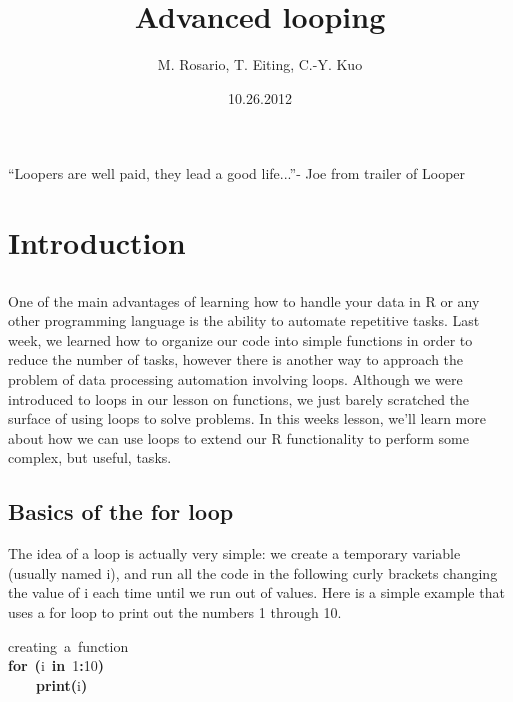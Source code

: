 \documentclass{article}\usepackage{graphicx, color}
\makeatletter
\newcommand{\hlnumber}[1]{\textcolor[rgb]{0,0,0}{#1}}%
\newcommand{\hlfunctioncall}[1]{\textcolor[rgb]{0.501960784313725,0,0.329411764705882}{\textbf{#1}}}%
\newcommand{\hlkeyword}[1]{\textcolor[rgb]{0,0,0}{\textbf{#1}}}%
\newcommand{\hlcomment}[1]{\textcolor[rgb]{0.180392156862745,0.6,0.341176470588235}{#1}}%
\newcommand{\hlsymbol}[1]{\textcolor[rgb]{0,0,0}{#1}}%
\newcommand{\hlstd}[1]{\textcolor[rgb]{0,0,0}{#1}}%
\newenvironment{kframe}{%
 \def\FrameCommand##1{\hskip\@totalleftmargin \hskip-\fboxsep
 \colorbox{shadecolor}{##1}\hskip-\fboxsep
     \hskip-\linewidth \hskip-\@totalleftmargin \hskip\columnwidth}%
 \MakeFramed {\advance\hsize-\width
   \@totalleftmargin\z@ \linewidth\hsize
   \@setminipage}}%
 {\par\unskip\endMakeFramed}
\newenvironment{knitrout}{}{} %
\makeatother
\begin{document}
\title{Advanced looping}

\author{M. Rosario, T. Eiting, C.-Y. Kuo}


\date{10.26.2012}

\maketitle
``Loopers are well paid, they lead a good life...''- Joe from trailer of Looper
\section{Introduction}


\subsection{}

One of the main advantages of learning how to handle your data in R or any other programming language is the ability to automate repetitive tasks. Last week, we learned how to organize our code into simple functions in order to reduce the number of tasks, however there is another way to approach the problem of data processing automation involving loops. Although we were introduced to loops in our lesson on functions, we just barely scratched the surface of using loops to solve problems. In this weeks lesson, we’ll learn more about how we can use loops to extend our R functionality to perform some complex, but useful, tasks.

\subsection{Basics of the for loop}
The idea of a loop is actually very simple: we create a temporary variable (usually named i), and run all the code in the following curly brackets changing the value of i each time until we run out of values. Here is a simple example that uses a for loop to print out the numbers 1 through 10.

\begin{knitrout}
\color{fgcolor}\begin{kframe}
\begin{flushleft}
\ttfamily\noindent
\hlcomment{\usebox{\hlnormalsizeboxhash}{\ }creating{\ }a{\ }function}\hspace*{\fill}\\
\hlstd{}\hlkeyword{for}{\ }\hlkeyword{(}\hlsymbol{i}{\ }\hlkeyword{in}{\ }\hlnumber{1}\hlkeyword{:}\hlnumber{10}\hlkeyword{)}{\ }\hlkeyword{\usebox{\hlnormalsizeboxopenbrace}}\hspace*{\fill}\\
\hlstd{}{\ }{\ }{\ }{\ }\hlfunctioncall{print}\hlkeyword{(}\hlsymbol{i}\hlkeyword{)}\hspace*{\fill}\\
\hlstd{}\hlkeyword{\usebox{\hlnormalsizeboxclosebrace}}\mbox{}
\normalfont
\end{flushleft}
\end{kframe}
\end{knitrout}
\end{document}
